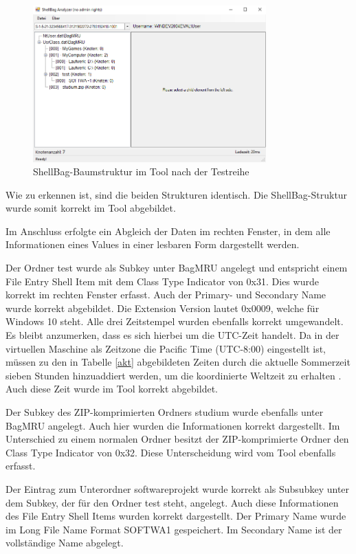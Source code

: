 \begin{figure}[H]
	\centering
	\includegraphics[width=0.8\textwidth]{part/nachher.png}
	\caption{ShellBag-Baumstruktur im Tool nach der Testreihe} 
	\label{img:nachher}
\end{figure}

Wie zu erkennen ist, sind die beiden Strukturen identisch. Die ShellBag-Struktur wurde somit korrekt im Tool abgebildet. 

Im Anschluss erfolgte ein Abgleich der Daten im rechten Fenster, in dem alle Informationen eines Values in einer lesbaren Form dargestellt werden. 

Der Ordner \glqq test\grqq{} wurde als Subkey unter BagMRU angelegt und entspricht einem File Entry Shell Item mit dem Class Type Indicator von 0x31. Dies wurde korrekt im rechten Fenster erfasst. Auch der Primary- und Secondary Name wurde korrekt abgebildet. Die Extension Version lautet 0x0009, welche für Windows 10 steht. Alle drei Zeitstempel wurden ebenfalls korrekt umgewandelt. Es bleibt anzumerken, dass es sich hierbei um die UTC-Zeit handelt. Da in der virtuellen Maschine als Zeitzone die Pacific Time (UTC-8:00) eingestellt ist, müssen zu den in Tabelle \ref{akt} abgebildeten Zeiten durch die aktuelle Sommerzeit sieben Stunden hinzuaddiert werden, um die koordinierte Weltzeit zu erhalten \cite{zz}. Auch diese Zeit wurde im Tool korrekt abgebildet. 

Der Subkey des ZIP-komprimierten Ordners \glqq studium\grqq{} wurde ebenfalls unter BagMRU angelegt. Auch hier wurden die Informationen korrekt dargestellt. Im Unterschied zu einem normalen Ordner besitzt der ZIP-komprimierte Ordner den Class Type Indicator von 0x32. Diese Unterscheidung wird vom Tool ebenfalls erfasst. 

Der Eintrag zum Unterordner \glqq softwareprojekt\grqq{} wurde korrekt als Subsubkey unter dem Subkey, der für den Ordner \glqq test\grqq{} steht, angelegt. Auch diese Informationen des File Entry Shell Items wurden korrekt dargestellt. Der Primary Name wurde im Long File Name Format \glqq SOFTWA\raisebox{-0.9ex}{\~{}}1\grqq{} gespeichert. Im Secondary Name ist der vollständige Name abgelegt.

